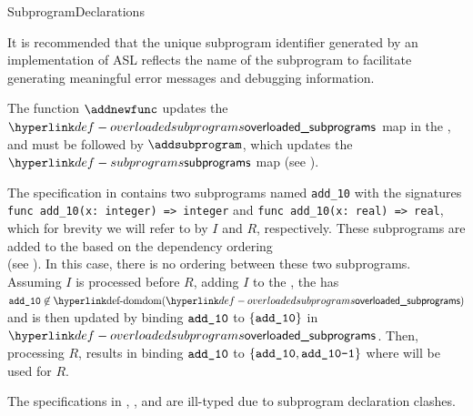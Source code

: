 \begin{TypingRuleList}{SubprogramDeclarations}
\FormallyParagraph
\begin{mathpar}
\end{mathpar}

It is recommended that the unique subprogram identifier generated by
an implementation of ASL reflects the name of the subprogram to facilitate
generating meaningful error messages and debugging information.

The function $\addnewfunc$ updates the $\overloadedsubprograms$ map in the \staticenvironmentterm{},
and must be followed by $\addsubprogram$, which updates the $\subprograms$ map (see ).

The specification in 
contains two subprograms named \verb|add_10| with the signatures
\verb|func add_10(x: integer) => integer| and
\verb|func add_10(x: real) => real|, which for brevity we will refer to by
$I$ and $R$, respectively.
These subprograms are added to the \staticenvironmentterm{}
based on the dependency ordering \\
(see ).
In this case, there is no ordering between these two subprograms.
Assuming $I$ is processed before $R$, adding $I$ to the
\staticenvironmentterm{}, the \staticenvironmentterm{} has
$\addten \not\in \dom(\overloadedsubprograms)$
and is then updated by binding $\texttt{add\_10}$ to $\{\texttt{add\_10}\}$ in $\overloadedsubprograms$.
Then, processing $R$, results in
binding $\texttt{add\_10}$ to
$\{\texttt{add\_10}, \texttt{add\_10-1}\}$ where \addtenone{} will be used for $R$.

The specifications in ,
, and
are ill-typed due to subprogram declaration clashes.


\end{TypingRuleList}
